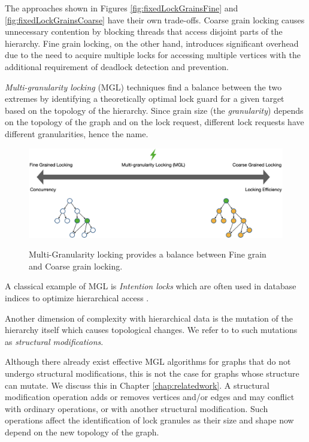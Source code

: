 The approaches shown in Figures \ref{fig:fixedLockGrainsFine} and \ref{fig:fixedLockGrainsCoarse} have their own trade-offs. 
Coarse grain locking causes unnecessary contention by blocking threads that access disjoint parts of the hierarchy. 
Fine grain locking, on the other hand, introduces significant overhead due to the need to acquire multiple locks for accessing multiple vertices with the additional requirement of deadlock detection and prevention.


\emph{Multi-granularity locking} (MGL) \cite{gray1975granularity} techniques find a balance between the two extremes by identifying a theoretically optimal lock guard for a given target based on the topology of the hierarchy.
Since grain size (the \emph{granularity}) depends on the topology of the graph and on the lock request, different lock requests have different granularities, hence the name.

\begin{figure}[h]
    \captionsetup{justification=centering}
    \includegraphics[width=\textwidth]{figures/MGLSpectrum.png}
    \label{fig:mglspectrum}
    \caption{Multi-Granularity locking provides a balance between Fine grain and Coarse grain locking.}
\end{figure}

A classical example of MGL is \emph{Intention locks} \cite{StonebrakerGranularity} which are often used in database indices to optimize hierarchical access \cite{sqlintentionlocks}. 

Another dimension of complexity with hierarchical data is the mutation of the hierarchy itself which causes topological changes.
We refer to to such mutations as \emph{structural modifications}.

Although there already exist effective MGL algorithms for graphs that do not undergo structural modifications, this is not the case for graphs whose structure can mutate. 
We discuss this in Chapter \ref{chap:relatedwork}.
A structural modification operation adds or removes vertices and{\slash}or edges and may conflict with ordinary operations, or with another structural modification.
Such operations affect the identification of lock granules as their size and shape now depend on the new topology of the graph.



